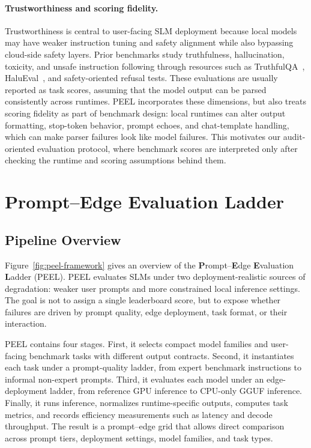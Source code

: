 \documentclass[letterpaper]{article} %
\begin{document}
\paragraph{Trustworthiness and scoring fidelity.}
Trustworthiness is central to user-facing SLM deployment because local models
may have weaker instruction tuning and safety alignment while also bypassing
cloud-side safety layers. Prior benchmarks study truthfulness, hallucination,
toxicity, and unsafe instruction following through resources such as
TruthfulQA~\cite{truthfulqa}, HaluEval~\cite{halueval2023}, and safety-oriented
refusal tests. These evaluations are usually reported as task scores, assuming
that the model output can be parsed consistently across runtimes. PEEL
incorporates these dimensions, but also treats scoring fidelity as part of
benchmark design: local runtimes can alter output formatting, stop-token
behavior, prompt echoes, and chat-template handling, which can make parser
failures look like model failures. This motivates our audit-oriented evaluation
protocol, where benchmark scores are interpreted only after checking the runtime
and scoring assumptions behind them.

\section{\textbf{P}rompt--\textbf{E}dge \textbf{E}valuation \textbf{L}adder}
\label{sec:peel}

\subsection{Pipeline Overview}
\label{sec:pipeline}

Figure~\ref{fig:peel-framework} gives an overview of the
\textbf{P}rompt--\textbf{E}dge \textbf{E}valuation \textbf{L}adder (PEEL).
PEEL evaluates SLMs under two deployment-realistic sources of degradation:
weaker user prompts and more constrained local inference settings. The goal is
not to assign a single leaderboard score, but to expose whether failures are
driven by prompt quality, edge deployment, task format, or their interaction.

PEEL contains four stages. First, it selects compact model families and
user-facing benchmark tasks with different output contracts. Second, it
instantiates each task under a prompt-quality ladder, from expert benchmark
instructions to informal non-expert prompts. Third, it evaluates each model
under an edge-deployment ladder, from reference GPU inference to CPU-only GGUF
inference. Finally, it runs inference, normalizes runtime-specific outputs,
computes task metrics, and records efficiency measurements such as latency and
decode throughput. The result is a prompt--edge grid that allows direct
comparison across prompt tiers, deployment settings, model families, and task
types.
\end{document}
